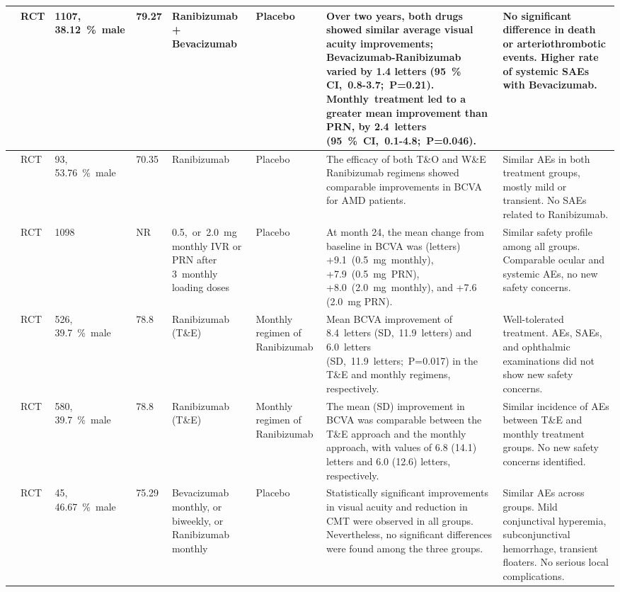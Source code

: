\begin{landscape}
\begin{longtable}{|p{1.5cm}|l|p{1.5cm}|p{1.3cm}|p{2.75cm}|p{2.5cm}|p{7.5cm}|p{4.75cm}|}
        \citet{catt2012} & RCT & \num{1107}, \qty{38.12}{\percent}~male & 79.27 & Ranibizumab + \mbox{Bevacizumab} & Placebo & Over two years, both drugs showed similar average visual acuity \mbox{improvements}; Bevacizumab-Ranibizumab varied by 1.4 letters (\qty{95}{\percent} CI,~0.8-3.7;~P=0.21). Monthly~\mbox{treatment} led to a greater mean improvement than PRN, by 2.4~\mbox{letters} (\qty{95}{\percent}~CI,~0.1-4.8;~P=0.046). & No significant difference in death or arteriothrombotic events. Higher rate of systemic SAEs with Bevacizumab.\\ \hline
        \citet{eldem2015} & RCT & \num{93}, \qty{53.76}{\percent}~male & 70.35 & Ranibizumab & Placebo & The efficacy of both T\&O and W\&E Ranibizumab regimens showed comparable improvements in BCVA for AMD patients. & Similar AEs in both treatment groups, mostly mild or transient. No SAEs \mbox{related} to Ranibizumab.\\ \hline
        \citet{ho2014} & RCT & \num{1098} & NR & 0.5,~or~2.0~mg monthly IVR or PRN after 3~monthly loading doses & Placebo & At month 24, the mean change from baseline in BCVA was (letters) +9.1~(0.5~mg~monthly), +7.9~(0.5~mg~PRN), +8.0~(2.0~mg~monthly), and +7.6 (2.0~mg PRN). & Similar safety profile among all groups. Comparable ocular and \mbox{systemic} AEs, no new safety \mbox{concerns}.\\ \hline
        \citet{kertes2019} & RCT & \num{526}, \qty{39.7}{\percent}~male & 78.8 & Ranibizumab (T\&E) & Monthly regimen of Ranibizumab & Mean BCVA improvement of 8.4~letters (SD,~11.9~\mbox{letters}) and 6.0~letters (SD,~11.9~\mbox{letters};~P=0.017) in the T\&E and monthly regimens, respectively. & Well-tolerated treatment. AEs, SAEs, and ophthalmic examinations did not show new safety concerns.\\ \hline
        \citet{kertes2020} & RCT & \num{580}, \qty{39.7}{\percent}~male & 78.8 & Ranibizumab (T\&E) & Monthly regimen of Ranibizumab & The mean (SD) improvement in BCVA was comparable \mbox{between} the T\&E approach and the monthly approach, with values of 6.8 (14.1) letters and 6.0 (12.6) letters, respectively. & Similar incidence of AEs between T\&E and monthly treatment groups. No new safety concerns identified.\\ \hline
        \citet{nunes2019} & RCT & \num{45}, \qty{46.67}{\percent}~male & 75.29 & Bevacizumab monthly, or \mbox{biweekly}, or Ranibizumab monthly & Placebo & Statistically significant improvements in visual acuity and reduction in CMT were observed in all groups. Nevertheless, no significant differences were found among the three groups. & Similar AEs across groups. Mild conjunctival hyperemia, subconjunctival hemorrhage, transient floaters. No \mbox{serious} local complications.\\ \hline

\end{longtable}
\end{landscape}
